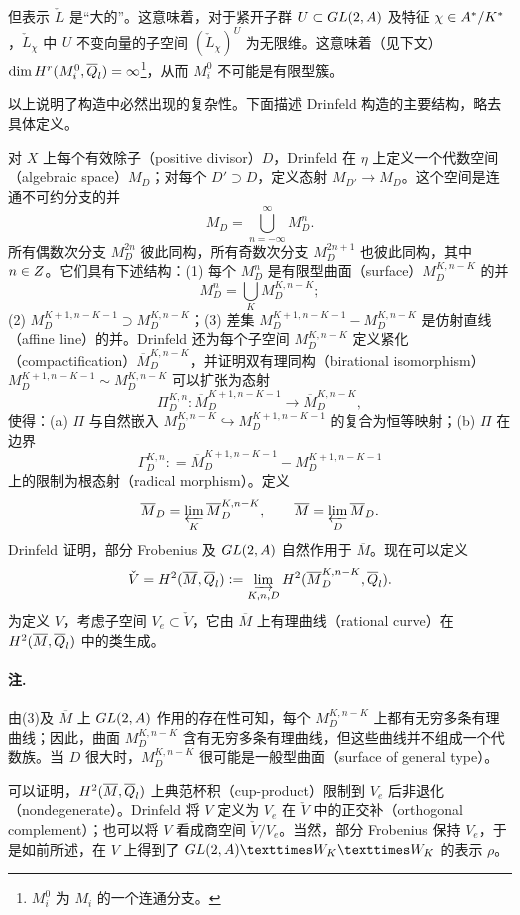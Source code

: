 但表示 $\check L$ 是“大的”。这意味着，对于紧开子群 $U\subset GL(2,A)$ 及特征 $\chi\in A^*/K^*$，$\check L_\chi$ 中 $U$ 不变向量的子空间 $(\check L_\chi)^U$ 为无限维。这意味着（见下文）$\dim H^r(M_i^0,\overline{Q}_l)=\infty$\footnote{$M_i^0$ 为 $M_i$ 的一个连通分支。}，从而 $M_i^0$ 不可能是有限型簇。

以上说明了构造中必然出现的复杂性。下面描述 Drinfeld 构造的主要结构，略去具体定义。

对 $X$ 上每个有效除子（positive divisor）$D$，Drinfeld 在 $\eta$ 上定义一个代数空间（algebraic space）$M_D$；对每个 $D'\supset D$，定义态射 $M_{D'}\longrightarrow M_D$。这个空间是连通不可约分支的并
\[
 M_D=\bigcup_{n=-\infty}^\infty M_D^n.
\]
所有偶数次分支 $M_D^{2n}$ 彼此同构，所有奇数次分支 $M_D^{2n+1}$ 也彼此同构，其中 $n\in Z$。它们具有下述结构：(1) 每个 $M_D^n$ 是有限型曲面（surface）$M_D^{K,n-K}$ 的并
\[
 M_D^n=\bigcup_K M_D^{K,n-K};
\]
(2) $M_D^{K+1,n-K-1}\supset M_D^{K,n-K}$；(3) 差集 $M_D^{K+1,n-K-1}-M_D^{K,n-K}$ 是仿射直线（affine line）的并。Drinfeld 还为每个子空间 $M_D^{K,n-K}$ 定义紧化（compactification）$\overline M_D^{K,n-K}$，并证明双有理同构（birational isomorphism）$M_D^{K+1,n-K-1}\sim M_D^{K,n-K}$ 可以扩张为态射
\[
 \Pi_D^{K,n}:\overline M_D^{K+1,n-K-1}
 \longrightarrow\overline M_D^{K,n-K},
\]
使得：(a) $\Pi$ 与自然嵌入 $M_D^{K,n-K}\hookrightarrow M_D^{K+1,n-K-1}$ 的复合为恒等映射；(b) $\Pi$ 在边界
\[
 \Gamma_D^{K,n}\mathrel{\mathop:}=
 \overline M_D^{K+1,n-K-1}-M_D^{K+1,n-K-1}
\]
上的限制为根态射（radical morphism）。定义
\[
 \overline M_D=\varprojlim_K\overline M_D^{K,n-K},
 \qquad \overline M=\varprojlim_D\overline M_D.
\]
Drinfeld 证明，部分 Frobenius 及 $GL(2,A)$ 自然作用于 $\overline M$。现在可以定义
\[
 \check V=H^2(\overline M,\overline{Q}_l)
 \mathrel{\mathop:}=\varinjlim_{K,n,D}
 H^2(\overline M_D^{K,n-K},\overline{Q}_l).
\]
为定义 $V$，考虑子空间 $V_e\subset\check V$，它由 $\overline M$ 上有理曲线（rational curve）在 $H^2(\overline M,\overline{Q}_l)$ 中的类生成。

\paragraph*{注.} 由(3)及 $\overline M$ 上 $GL(2,A)$ 作用的存在性可知，每个 $M_D^{K,n-K}$ 上都有无穷多条有理曲线；因此，曲面 $M_D^{K,n-K}$ 含有无穷多条有理曲线，但这些曲线并不组成一个代数族。当 $D$ 很大时，$M_D^{K,n-K}$ 很可能是一般型曲面（surface of general type）。

可以证明，$H^2(\overline M,\overline{Q}_l)$ 上典范杯积（cup-product）限制到 $V_e$ 后非退化（nondegenerate）。Drinfeld 将 $V$ 定义为 $V_e$ 在 $\check V$ 中的正交补（orthogonal complement）；也可以将 $V$ 看成商空间 $\check V/V_e$。当然，部分 Frobenius 保持 $V_e$，于是如前所述，在 $V$ 上得到了 $\GL(2,\A)\times W_K\times W_K$ 的表示 $\rho$。

